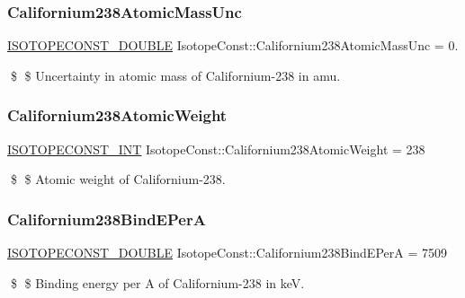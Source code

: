 \subsubsection{\texorpdfstring{Californium238\+Atomic\+Mass\+Unc}{Californium238AtomicMassUnc}}
{\footnotesize\ttfamily \mbox{\hyperlink{group___isotope_const-_macros_ga8f45a7272ce02c0b4c65c44636ed719a}{I\+S\+O\+T\+O\+P\+E\+C\+O\+N\+S\+T\+\_\+\+D\+O\+U\+B\+LE}} Isotope\+Const\+::\+Californium238\+Atomic\+Mass\+Unc = 0.}

\$ \$ Uncertainty in atomic mass of Californium-\/238 in amu. \mbox{\label{group___isotope_const-_californium-_cf238_ga8ca72f8b38003c1506bc19e695309b2b}} 
\subsubsection{\texorpdfstring{Californium238\+Atomic\+Weight}{Californium238AtomicWeight}}
{\footnotesize\ttfamily \mbox{\hyperlink{group___isotope_const-_macros_ga5f18360b3e99483a35c32d789e62621c}{I\+S\+O\+T\+O\+P\+E\+C\+O\+N\+S\+T\+\_\+\+I\+NT}} Isotope\+Const\+::\+Californium238\+Atomic\+Weight = 238}

\$ \$ Atomic weight of Californium-\/238. \mbox{\label{group___isotope_const-_californium-_cf238_ga66cc0bfb98bd025934ba9e500b21c2e6}} 
\subsubsection{\texorpdfstring{Californium238\+Bind\+E\+PerA}{Californium238BindEPerA}}
{\footnotesize\ttfamily \mbox{\hyperlink{group___isotope_const-_macros_ga8f45a7272ce02c0b4c65c44636ed719a}{I\+S\+O\+T\+O\+P\+E\+C\+O\+N\+S\+T\+\_\+\+D\+O\+U\+B\+LE}} Isotope\+Const\+::\+Californium238\+Bind\+E\+PerA = 7509}

\$ \$ Binding energy per A of Californium-\/238 in keV. \mbox{\label{group___isotope_const-_californium-_cf238_ga062d394abe5326237b7d491a0d5fd163}} 
